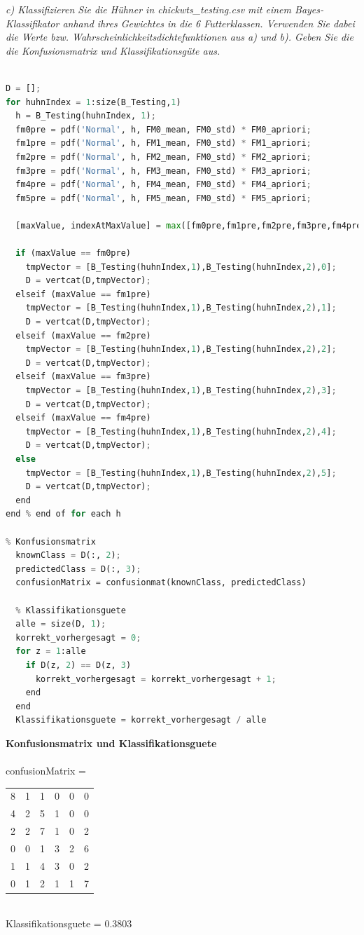 \documentclass[12pt]{article}
\begin{document}
\textit{c) Klassifizieren Sie die Hühner in chickwts\_testing.csv​ ​mit einem Bayes­Klassifikator anhand ihres Gewichtes in die 6 Futterklassen. Verwenden Sie dabei die Werte bzw. Wahrscheinlichkeitsdichtefunktionen aus a) und b). Geben Sie die die Konfusionsmatrix und Klassifikationsgüte aus.}\\
\\
\begin{lstlisting}[language=Python]
D = [];
for huhnIndex = 1:size(B_Testing,1)
  h = B_Testing(huhnIndex, 1);
  fm0pre = pdf('Normal', h, FM0_mean, FM0_std) * FM0_apriori;
  fm1pre = pdf('Normal', h, FM1_mean, FM0_std) * FM1_apriori;
  fm2pre = pdf('Normal', h, FM2_mean, FM0_std) * FM2_apriori;
  fm3pre = pdf('Normal', h, FM3_mean, FM0_std) * FM3_apriori;
  fm4pre = pdf('Normal', h, FM4_mean, FM0_std) * FM4_apriori;
  fm5pre = pdf('Normal', h, FM5_mean, FM0_std) * FM5_apriori;
  
  [maxValue, indexAtMaxValue] = max([fm0pre,fm1pre,fm2pre,fm3pre,fm4pre,fm5pre]);
  
  if (maxValue == fm0pre)
    tmpVector = [B_Testing(huhnIndex,1),B_Testing(huhnIndex,2),0];
    D = vertcat(D,tmpVector);
  elseif (maxValue == fm1pre)
    tmpVector = [B_Testing(huhnIndex,1),B_Testing(huhnIndex,2),1];
    D = vertcat(D,tmpVector);
  elseif (maxValue == fm2pre)
    tmpVector = [B_Testing(huhnIndex,1),B_Testing(huhnIndex,2),2];
    D = vertcat(D,tmpVector);  
  elseif (maxValue == fm3pre)
    tmpVector = [B_Testing(huhnIndex,1),B_Testing(huhnIndex,2),3];
    D = vertcat(D,tmpVector);
  elseif (maxValue == fm4pre)
    tmpVector = [B_Testing(huhnIndex,1),B_Testing(huhnIndex,2),4];
    D = vertcat(D,tmpVector);
  else
    tmpVector = [B_Testing(huhnIndex,1),B_Testing(huhnIndex,2),5];
    D = vertcat(D,tmpVector);
  end
end % end of for each h

% Konfusionsmatrix
  knownClass = D(:, 2);
  predictedClass = D(:, 3);
  confusionMatrix = confusionmat(knownClass, predictedClass)

  % Klassifikationsguete
  alle = size(D, 1);
  korrekt_vorhergesagt = 0;
  for z = 1:alle
    if D(z, 2) == D(z, 3)
      korrekt_vorhergesagt = korrekt_vorhergesagt + 1;
    end
  end
  Klassifikationsguete = korrekt_vorhergesagt / alle
\end{lstlisting}
\textbf{Konfusionsmatrix und Klassifikationsguete}\\
\\
confusionMatrix =\\
\begin{tabular}{ c c c c c c }
 8 & 1 & 1 & 0 & 0 & 0\\
 4 & 2 & 5 & 1 & 0 & 0\\
 2 & 2 & 7 & 1 & 0 & 2\\
 0 & 0 & 1 & 3 & 2 & 6\\
 1 & 1 & 4 & 3 & 0 & 2\\
 0 & 1 & 2 & 1 & 1 & 7\\
\end{tabular}\\
Klassifikationsguete = 0.3803
\end{document}
